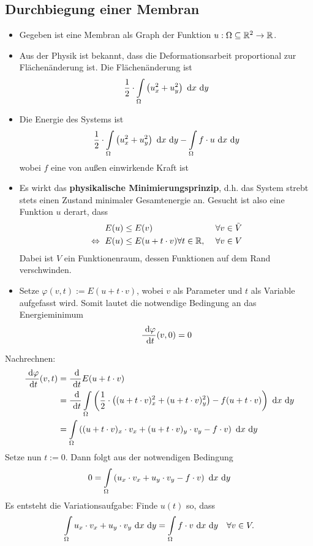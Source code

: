\subsection{Durchbiegung einer Membran}
\begin{itemize}
\item Gegeben ist eine Membran als Graph der Funktion $u:\Omega\subseteq\mathbb{R}^2\to\mathbb{R}$.
\item Aus der Physik ist bekannt, dass die Deformationsarbeit proportional zur Flächenänderung ist. Die Flächenänderung ist
\begin{align*}
\frac{1}{2}\cdot\int\limits_\Omega\left(u^2_x+u_y^2\right)\text{ d} x\text{ d} y
\end{align*}
\item Die Energie des Systems ist 
\begin{align*}
\frac{1}{2}\cdot\int\limits_\Omega\left(u^2_x+u_y^2\right)\text{ d} x\text{ d} y-\int\limits_\Omega f\cdot u\text{ d} x\text{ d} y
\end{align*}
wobei $f$ eine von außen einwirkende Kraft ist
\item Es wirkt das \textbf{physikalische Minimierungsprinzip}, d.h. das System strebt stets einen Zustand minimaler Gesamtenergie an. Gesucht ist also eine Funktion $u$ derart, dass 
\begin{align*}
	E(u)&\leq E(v)&\forall v\in\tilde{V}\\
	\Leftrightarrow ~ E(u)&\leq E(u+t\cdot v)\forall t\in\mathbb{R},~&\forall v\in V
\end{align*}
Dabei ist $V$ ein Funktionenraum, dessen Funktionen auf dem Rand verschwinden.
\item Setze $\varphi(v,t):=E(u+t\cdot v)$, wobei $v$ als Parameter und $t$ als Variable aufgefasst wird. Somit lautet die notwendige Bedingung an das Energieminimum
\begin{align*}
\frac{\text{ d}\varphi}{\text{ d} t}(v,0)=0
\end{align*}
\end{itemize}
Nachrechnen:
\begin{align*}
\frac{\text{ d}\varphi}{\text{ d} t}(v,t)
&=\frac{\text{ d}}{\text{ d} t}E(u+t\cdot v)\\
&=\frac{\text{ d}}{\text{ d} t}\int\limits_\Omega\left(\frac{1}{2}\cdot\left((u+t\cdot v)_x^2+(u+t\cdot v)_y^2\right)-f(u+t\cdot v)\right)\text{ d} x\text{ d} y\\
&=\int\limits_\Omega\left((u+t\cdot v)_x\cdot v_x+(u+t\cdot v)_y\cdot v_y-f\cdot v\right)\text{ d} x\text{ d} y
\end{align*}
Setze nun $t:=0$. Dann folgt aus der notwendigen Bedingung
\begin{align*}
0=\int\limits_\Omega\left(u_x\cdot v_x+u_y\cdot v_y-f\cdot v\right)\text{ d} x\text{ d} y
\end{align*}
Es entsteht die Variationsaufgabe: Finde $u(t)$ so, dass 
\begin{align*}
\int\limits_\Omega u_x\cdot v_x+u_y\cdot v_y\text{ d} x\text{ d} y=\int\limits_\Omega f\cdot v\text{ d} x\text{ d} y~~~\forall v\in V.
\end{align*}

